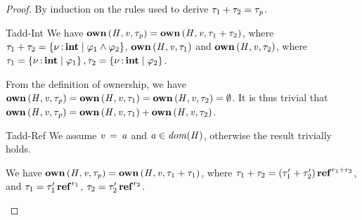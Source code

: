 \begin{proof}
  By induction on the rules used to derive $\tau_{{\mathrm{1}}}  +  \tau_{{\mathrm{2}}}  =  \tau_{\mathit{p}}$.
  \begin{rncase}{Tadd-Int}
    We have $\mathbf{own} \, (  \mathit{H}  ,  \mathit{v}  ,  \tau_{\mathit{p}}  )  =  \mathbf{own} \, (  \mathit{H}  ,  \mathit{v}  ,  \tau_{{\mathrm{1}}}  +  \tau_{{\mathrm{2}}}  )$, where $\tau_{{\mathrm{1}}}  +  \tau_{{\mathrm{2}}}  =   \left\{{  \nu  \operatorname{:} \mathbf{int} \mid   \varphi_{{\mathrm{1}}}  \wedge  \varphi_{{\mathrm{2}}}  }\right\} $,
    $\mathbf{own} \, (  \mathit{H}  ,  \mathit{v}  ,  \tau_{{\mathrm{1}}}  )$ and $\mathbf{own} \, (  \mathit{H}  ,  \mathit{v}  ,  \tau_{{\mathrm{2}}}  )$, where $\tau_{{\mathrm{1}}}  =   \left\{{  \nu  \operatorname{:} \mathbf{int} \mid  \varphi_{{\mathrm{1}}} }\right\} , \tau_{{\mathrm{2}}}  =   \left\{{  \nu  \operatorname{:} \mathbf{int} \mid  \varphi_{{\mathrm{2}}} }\right\} $.
  
    From the definition of ownership, we have $\mathbf{own} \, (  \mathit{H}  ,  \mathit{v}  ,  \tau_{\mathit{p}}  )  =  \mathbf{own} \, (  \mathit{H}  ,  \mathit{v}  ,  \tau_{{\mathrm{1}}}  )  =  \mathbf{own} \, (  \mathit{H}  ,  \mathit{v}  ,  \tau_{{\mathrm{2}}}  )  =   \emptyset $.
    It is thus trivial that $\mathbf{own} \, (  \mathit{H}  ,  \mathit{v}  ,  \tau_{\mathit{p}}  )  =  \mathbf{own} \, (  \mathit{H}  ,  \mathit{v}  ,  \tau_{{\mathrm{1}}}  )  +  \mathbf{own} \, (  \mathit{H}  ,  \mathit{v}  ,  \tau_{{\mathrm{2}}}  )$.
  \end{rncase}

  \begin{rncase}{Tadd-Ref}
    We assume $\mathit{v} \, = \, \mathit{a}$ and $ \mathit{a}  \in   \mathit{dom}( \mathit{H} )  $, otherwise the result trivially holds.
    
    We have $\mathbf{own} \, (  \mathit{H}  ,  \mathit{v}  ,  \tau_{\mathit{p}}  )  =  \mathbf{own} \, (  \mathit{H}  ,  \mathit{v}  ,  \tau_{{\mathrm{1}}}  +  \tau_{{\mathrm{1}}}  )$, where $\tau_{{\mathrm{1}}}  +  \tau_{{\mathrm{2}}}  =   (  \tau'_{{\mathrm{1}}}  +  \tau'_{{\mathrm{2}}}  )  \operatorname{\mathbf{ref}}^{ r_{{\mathrm{1}}}  +  r_{{\mathrm{2}}} } $,
    and  $\tau_{{\mathrm{1}}}  =   \tau'_{{\mathrm{1}}}  \operatorname{\mathbf{ref}}^{ r_{{\mathrm{1}}} } $, $\tau_{{\mathrm{2}}}  =   \tau'_{{\mathrm{2}}}  \operatorname{\mathbf{ref}}^{ r_{{\mathrm{2}}} } $.
    

\end{rncase}
\end{proof}

